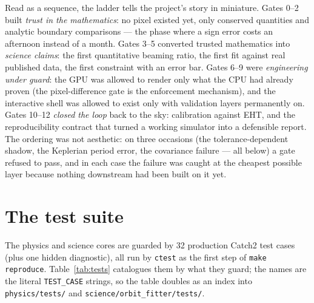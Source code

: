 Read as a sequence, the ladder tells the project's story in
miniature. Gates 0--2 built \emph{trust in the mathematics}: no
pixel existed yet, only conserved quantities and analytic boundary
comparisons — the phase where a sign error costs an afternoon instead
of a month. Gates 3--5 converted trusted mathematics into
\emph{science claims}: the first quantitative beaming ratio, the
first fit against real published data, the first constraint with an
error bar. Gates 6--9 were \emph{engineering under guard}: the GPU
was allowed to render only what the CPU had already proven
(the pixel-difference gate is the enforcement mechanism), and the
interactive shell was allowed to exist only with validation layers
permanently on. Gates 10--12 \emph{closed the loop} back to the sky:
calibration against EHT, and the reproducibility contract that turned
a working simulator into a defensible report. The ordering was not
aesthetic: on three occasions (the tolerance-dependent shadow, the
Keplerian period error, the covariance failure — all below) a gate
refused to pass, and in each case the failure was caught at the
cheapest possible layer because nothing downstream had been built on
it yet.

\section{The test suite}
\label{sec:testsuite}

The physics and science cores are guarded by 32 production Catch2 test
cases (plus one hidden diagnostic), all run by \texttt{ctest} as the
first step of \texttt{make reproduce}. Table~\ref{tab:tests} catalogues
them by what they guard; the names are the literal
\texttt{TEST\_CASE} strings, so the table doubles as an index into
\texttt{physics/tests/} and
\texttt{science/orbit\_fitter/tests/}.


